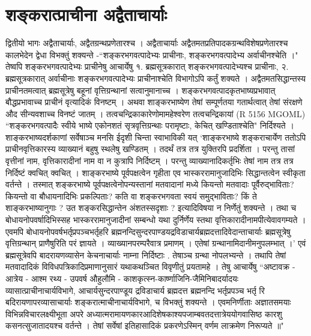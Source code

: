 \chapter{शङ्करात्प्राचीना अद्वैताचार्याः}
द्वितीयो भागः
अद्वैताचार्याः, अद्वैतग्रन्थप्रणेतारश्च ।
अद्वैताचार्याः अद्वैतमतप्रतिपादकग्रन्थविशेषप्रणेतारश्च कालभेदेन द्वेधा विभक्तुं शक्यन्ते -``शङ्करभगवत्पादेभ्यः प्राचीनाः, शङ्करभगवत्पादेभ्य अर्वाचीनश्चेति ।" तेष्वपि शङ्करभगवत्पादेभ्यः प्राचीनेषु आचार्येषु १. ब्रह्मसूत्रकारात् शङ्करभगवत्पादेभ्यश्च प्राचीनाः, २. ब्रह्मसूत्रकारात् अर्वाचीनाः शङ्करभगवत्पादेभ्यः प्राचीनाश्चेति विभागोऽपि कर्तुं शक्यते । अद्वैतमतसिद्धान्तस्य प्राचीनतमत्वात् ब्रह्मसूत्रेषु बहूनां वृत्तिग्रन्थानां सत्वानुमानाच्च । शङ्करभगवत्पादकृतभाष्यप्रभावात् बौद्धप्रभावाच्च प्राचीनं वृत्यादिकं विनष्टम् । अथवा शाङ्करभाष्येण तेषां सम्पूर्णतया गतार्थत्वात् तेषां संरक्षणे औद सीन्यवशाच्च विनष्टं जातम् । तत्वचन्द्रिकाकारेणोमामहेश्वरेण तत्वचन्द्रिकायां (R 5156 MGOML) ``शङ्करभगवत्पादैः स्वीये भाष्ये एकोनशतं सृत्रवृत्तिग्रन्थाः परामृष्टाः, केचित् खण्डिताश्चेति" निर्दिश्यते । शाङ्करभाष्यदर्शकाणां सर्वेषाञ्च मनसि ईदृशी चिन्ता स्वाभाविकी यत् `शाङ्करभाष्ये शङ्कराचार्येण ततोऽपि प्राचीनवृत्तिकारस्य व्याख्यानं बहुषु स्थलेषु खण्डितम् । तदर्थं तत्र तत्र युक्तिरपि प्रदर्शिता । परन्तु तासां वृत्तीनां नाम, वृत्तिकारादीनां नाम वा न कुत्रापि निर्दिष्टम् । परन्तु व्याख्यानादिकर्तृभिः तेषां नाम तत्र तत्र निर्दिष्टं क्वचित् क्वचित् । शाङ्करभाष्ये पूर्वपक्षत्वेन गृहीता एव भास्कररामानुजादिभिः सिद्धान्तत्वेन स्वीकृता वर्तन्ते । तस्मात् शङ्करभाष्ये पूर्वपक्षत्वेनोपन्यस्तानां मतवादानां मध्ये कियन्तो मतवादाः पूर्वैरुद्भाविताः? कियन्तो वा बौधायनादिभिः प्रकल्पिताः? कति वा शङ्करभगवता स्वयं समुद्भाविताः? किं ते शाङ्करभाष्यानुगाः ? उत शङ्करसिद्धान्तेन अंशतस्सदृशाः ? इत्यादिविषया न निर्णेतुं शक्यन्ते । तथा च बोधायनोपवर्षादिभिस्सह भास्कररामानुजादीनां सम्बन्धो यथा दुर्निर्णेय स्तथा वृत्तिकारादीनामपीत्येवावगम्यते । एवमपि बोधायनोपवर्षभर्तृप्रपञ्चभर्तृहरि ब्रह्मनन्दिसुन्दरपाण्डयद्रविडाचार्यब्रह्मदत्तादिवेदान्ताचार्याः ब्रह्मसूत्रेषु वृत्तिग्रन्थान् प्राणैषुरिति परं ज्ञायते । व्याख्यानपरम्परैवात्र प्रमाणम् । एतेषां ग्रन्थानामिदानीमनुपलम्भात् ।'
एवं ब्रह्मसूत्रेवपि बादरायणव्यासेन केचनाचार्याः नाम्ना निर्दिष्टाः . तेषाञ्च ग्रन्था नोपलभ्यन्ते । तथापि तेषां मतवादादिकं विविधपत्रिकादिप्रमाणानुसारं यथाकथञ्चित विवृणीतुं प्रयतामहे । तेषु आचार्येषु ``अष्टावक्र - आत्रेय - आश्म रथ्य - उपवर्ष औहुलौमि - काशकृत्स्न-कार्ष्णाजिनि-जैमिनिबादर्यादयः व्यासात्प्राचीनाचार्यविभागे, आचार्यसुन्दरपाण्डूय द्रविडाचार्य ब्रह्मदत्त ब्रह्मनन्दि भर्तृप्रपञ्च भर्तृ रि बदिरायणापरव्यासाचार्याः शङ्करात्माचीनाचार्यविभागे, च विभक्तुं शक्यन्ते । एवमनिर्णीताः अज्ञातसमयाः विभिन्नविचारलक्ष्यीभूता अपरे अध्यात्मरामायणकारआदिशेषकाश्यपजाम्बवतदत्तात्रेययोगवासिष्ठ कारशु कसनत्सुजातादयश्च वर्तन्ते । तेषां सर्वेषां इतिहासादिकं प्रकरणेऽस्मिन् वर्णम लाक्रमेण निरूप्यते ॥"

